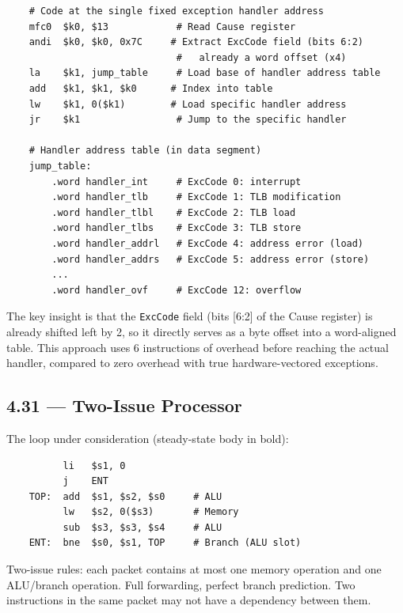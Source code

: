 \begin{verbatim}
    # Code at the single fixed exception handler address
    mfc0  $k0, $13            # Read Cause register
    andi  $k0, $k0, 0x7C     # Extract ExcCode field (bits 6:2)
                              #   already a word offset (x4)
    la    $k1, jump_table     # Load base of handler address table
    add   $k1, $k1, $k0      # Index into table
    lw    $k1, 0($k1)        # Load specific handler address
    jr    $k1                 # Jump to the specific handler

    # Handler address table (in data segment)
    jump_table:
        .word handler_int     # ExcCode 0: interrupt
        .word handler_tlb     # ExcCode 1: TLB modification
        .word handler_tlbl    # ExcCode 2: TLB load
        .word handler_tlbs    # ExcCode 3: TLB store
        .word handler_addrl   # ExcCode 4: address error (load)
        .word handler_addrs   # ExcCode 5: address error (store)
        ...
        .word handler_ovf     # ExcCode 12: overflow
\end{verbatim}

\noindent The key insight is that the \texttt{ExcCode} field (bits [6:2] of
the Cause register) is already shifted left by 2, so it directly serves as a
byte offset into a word-aligned table.  This approach uses 6 instructions
of overhead before reaching the actual handler, compared to zero overhead
with true hardware-vectored exceptions.

\subsection*{4.31 --- Two-Issue Processor}
\hypertarget{sol-4.31}{}

The loop under consideration (steady-state body in bold):

\begin{verbatim}
          li   $s1, 0
          j    ENT
    TOP:  add  $s1, $s2, $s0     # ALU
          lw   $s2, 0($s3)       # Memory
          sub  $s3, $s3, $s4     # ALU
    ENT:  bne  $s0, $s1, TOP     # Branch (ALU slot)
\end{verbatim}

\noindent Two-issue rules: each packet contains at most one memory operation
and one ALU/branch operation.  Full forwarding, perfect branch prediction.
Two instructions in the same packet may not have a dependency between them.

